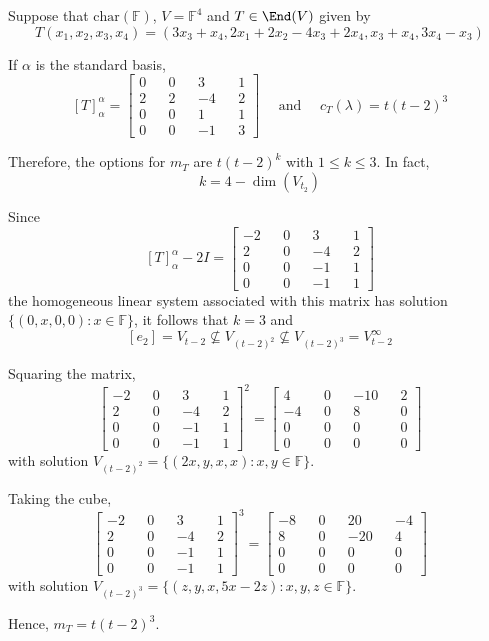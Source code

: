 \begin{example}\label{ex:canonical_forms_1}
	Suppose that $\text{char}(\mathbb{F})$, $V = \mathbb{F}^4$ and $T \in \End(V)$ given by 
	\[
		T(x_1, x_2, x_3, x_4) = (3x_3 + x_4, 2x_1+2x_2 - 4x_3 + 2 x_4, x_3 + x_4, 3x_4 - x_3)
	\]
	
	If $\alpha$ is the standard basis,
	\[
		[T]_\alpha^\alpha = \begin{bmatrix}
		0 && 0 && 3 && 1 \\
		2 && 2 && -4 && 2 \\
		0 && 0 && 1 && 1 \\
		0 && 0 && -1 && 3
		\end{bmatrix}
		\quad \text{ and } \quad c_T(\lambda) = t(t-2)^3
	\]
	
	Therefore, the options for $m_T$ are $t(t-2)^k$ with $1 \leq k \leq 3$. In fact,
	\[
		k = 4 - \dim(V_{t_2})
	\]
	
	Since
	\[
		[T]_\alpha^\alpha - 2I = \begin{bmatrix}
		-2 && 0 && 3 && 1 \\
		2 && 0 && -4 && 2 \\
		0 && 0 && -1 && 1 \\
		0 && 0 && -1 && 1
		\end{bmatrix}
	\]
	the homogeneous linear system associated with this matrix has solution $\{ (0, x, 0, 0) : x \in \mathbb{F} \}$, it follows that $k = 3$ and 
	\[
		[e_2] = V_{t-2} \not\subseteq V_{(t-2)^2} \not\subseteq V_{(t-2)^3} = V_{t-2}^\infty
	\]
	
	Squaring the matrix,
	\[
		\begin{bmatrix}
		-2 && 0 && 3 && 1 \\
		2 && 0 && -4 && 2 \\
		0 && 0 && -1 && 1 \\
		0 && 0 && -1 && 1
		\end{bmatrix}^2
		= \begin{bmatrix}
		4 && 0 && -10 && 2 \\
		-4 && 0 && 8 && 0 \\
		0 && 0 && 0 && 0 \\
		0 && 0 && 0 && 0
		\end{bmatrix}
	\]
	with solution $V_{(t-2)^2} = \{ (2x, y, x, x) : x, y \in \mathbb{F} \}$.
	
	Taking the cube,
	\[
		\begin{bmatrix}
		-2 && 0 && 3 && 1 \\
		2 && 0 && -4 && 2 \\
		0 && 0 && -1 && 1 \\
		0 && 0 && -1 && 1
		\end{bmatrix}^3
		= \begin{bmatrix}
		-8 && 0 && 20 && -4 \\
		8 && 0 && -20 && 4 \\
		0 && 0 && 0 && 0 \\
		0 && 0 && 0 && 0
		\end{bmatrix}
	\]
	with solution $V_{(t-2)^3} = \{ (z, y, x, 5x-2z) : x, y, z \in \mathbb{F} \}$.
	
	Hence, $m_T = t(t-2)^3$.
\end{example}

